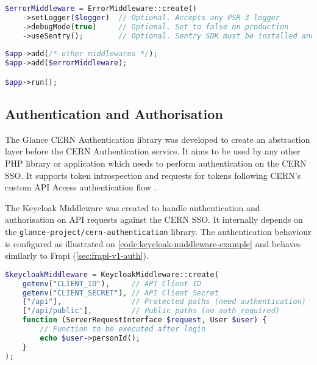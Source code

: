 \begin{lstlisting}[language=PHP,caption={Usage example of the error middleware.}]
$errorMiddleware = ErrorMiddleware::create()
	->setLogger($logger)  // Optional. Accepts any PSR-3 logger
	->debugMode(true)     // Optional. Set to false on production
	->useSentry();        // Optional. Sentry SDK must be installed and configured
	
$app->add(/* other middlewares */);
$app->add($errorMiddleware);

$app->run();
\end{lstlisting}

\subsection{Authentication and Authorisation}
\label{sec:authentication-and-authorisation}

The Glance CERN Authentication library \cite{cern-authentication-lib} was developed to create an abstraction layer before the CERN Authentication service. It aims to be used by any other PHP library or application which needs to perform authentication on the CERN SSO. It supports token introspection \cite{oauth-token-introspection} \cite{cern-auth-lib-introspec-token} and requests for tokens following CERN's custom API Access authentication flow \cite{cern-auth-service-api-access} \cite{cern-auth-lib-api-access}.

The Keycloak Middleware \cite{keycloak-middleware} was created to handle authentication and authorisation on API requests against the CERN SSO. It internally depends on the \texttt{glance-project/cern-authentication} library. The authentication behaviour is configured as illustrated on \autoref{code:keycloak-middleware-example} and behaves similarly to Frapi (\autoref{sec:frapi-v1-auth}).

\begin{lstlisting}[language=PHP,label={code:keycloak-middleware-example},caption={Usage example of the Keycloak middleware.}]
$keycloakMiddleware = KeycloakMiddleware::create(
    getenv("CLIENT_ID"),     // API Client ID
    getenv("CLIENT_SECRET"), // API Client Secret
    ["/api"],                // Protected paths (need authentication)
    ["/api/public"],         // Public paths (no auth required)
    function (ServerRequestInterface $request, User $user) {
	    // Function to be executed after login
        echo $user->personId();
    }
);
\end{lstlisting}

